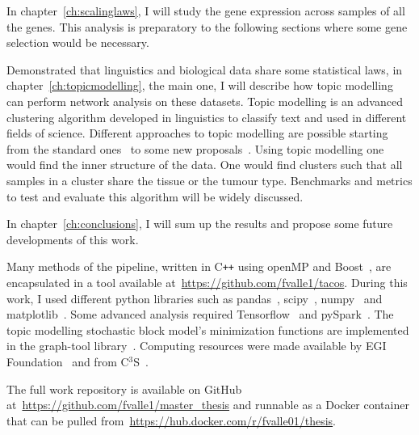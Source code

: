 In chapter~\ref{ch:scalinglaws}, I will study the gene expression across samples of all the genes. This analysis is preparatory to the following sections where some gene selection would be necessary.

Demonstrated that linguistics and biological data share some statistical laws, in chapter~\ref{ch:topicmodelling}, the main one, I will describe how topic modelling can perform network analysis on these datasets. Topic modelling is an advanced clustering algorithm developed in linguistics to classify text and used in different fields of science. Different approaches to topic modelling are possible starting from the standard ones~\cite{Zhou2016} to some new proposals~\cite{Lancichinetti2015,Martini2017,gerlach2018network}. Using topic modelling one would find the inner structure of the data. One would find clusters such that all samples in a cluster share the tissue or the tumour type. Benchmarks and metrics to test and evaluate this algorithm will be widely discussed.

In chapter~\ref{ch:conclusions}, I will sum up the results and propose some future developments of this work.

Many methods of the pipeline, written in C\texttt{++} using openMP and Boost~\cite{siek2002boost}, are encapsulated in a tool available at~\url{https://github.com/fvalle1/tacos}. During this work, I used different python libraries such as pandas~\cite{mckinney2010data}, scipy~\cite{jones2014scipy}, numpy~\cite{oliphant2006guide} and matplotlib~\cite{hunter2007matplotlib}. Some advanced analysis required Tensorflow~\cite{tensorflow2015-whitepaper} and pySpark~\cite{Zaharia:2016:ASU:3013530.2934664}. The topic modelling stochastic block model's minimization functions are implemented in the graph-tool library~\cite{peixoto_graph-tool_2014}. Computing resources were made available by EGI Foundation~\cite{fernandez2015egi} and from C$^{\text{3}}$S~\cite{occamchep}.

The full work repository is available on GitHub\textsuperscript{\tiny\textcopyright} at~\url{https://github.com/fvalle1/master_thesis} and runnable as a Docker\textsuperscript{\tiny\textcopyright} container that can be pulled from~\url{https://hub.docker.com/r/fvalle01/thesis}. 